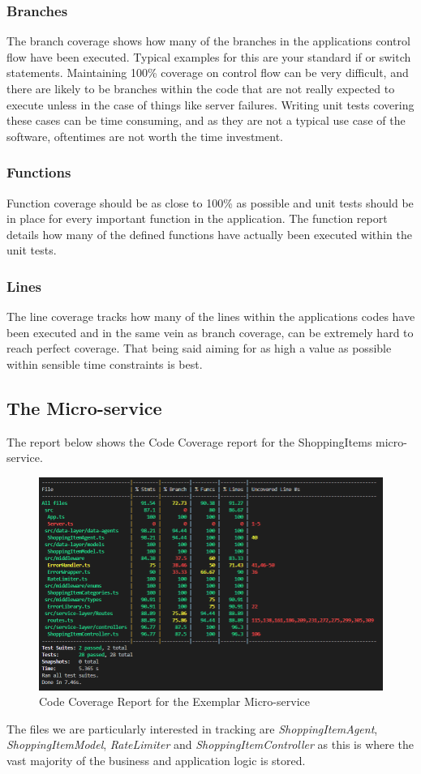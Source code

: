 \subsubsection{Branches}
The branch coverage shows how many of the branches in the applications control flow have been executed. Typical examples for this are your standard if or switch statements. Maintaining 100\% coverage on control flow can be very difficult, and there are likely to be branches within the code that are not really expected to execute unless in the case of things like server failures. Writing unit tests covering these cases can be time consuming, and as they are not a typical use case of the software, oftentimes are not worth the time investment.
\subsubsection{Functions}
Function coverage should be as close to 100\% as possible and unit tests should be in place for every important function in the application. The function report details how many of the defined functions have actually been executed within the unit tests.
\subsubsection{Lines}
The line coverage tracks how many of the lines within the applications codes have been executed and in the same vein as branch coverage, can be extremely hard to reach perfect coverage. That being said aiming for as high a value as possible within sensible time constraints is best.
\subsection{The Micro-service}
The report below shows the Code Coverage report for the ShoppingItems micro-service.
\begin{figure}[!htb]
\caption{Code Coverage Report for the Exemplar Micro-service}
\centering
\includegraphics[scale=0.62]{FYP_Dissertation_template/Figures/microservice-code-coverage.PNG}
\end{figure}
\FloatBarrier
The files we are particularly interested in tracking are \textit{ShoppingItemAgent}, \textit{ShoppingItemModel}, \textit{RateLimiter} and \textit{ShoppingItemController} as this is where the vast majority of the business and application logic is stored.
